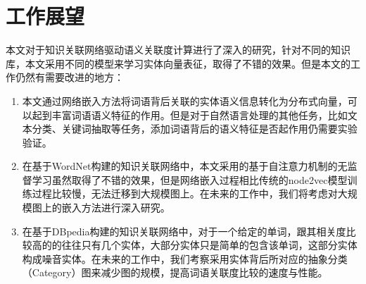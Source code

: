 \section{工作展望}
本文对于知识关联网络驱动语义关联度计算进行了深入的研究，针对不同的知识库，本文采用不同的模型来学习实体向量表征，取得了不错的效果。但是本文的工作仍然有需要改进的地方：
\begin{enumerate}[（1）]
    \item 本文通过网络嵌入方法将词语背后关联的实体语义信息转化为分布式向量，可以起到丰富词语语义特征的作用。但是对于自然语言处理的其他任务，比如文本分类、关键词抽取等任务，添加词语背后的语义特征是否起作用仍需要实验验证。
    \item 在基于WordNet构建的知识关联网络中，本文采用的基于自注意力机制的无监督学习虽然取得了不错的效果，但是网络嵌入过程相比传统的node2vec模型训练过程比较慢，无法迁移到大规模图上。在未来的工作中，我们将考虑对大规模图上的嵌入方法进行深入研究。
    \item 在基于DBpedia构建的知识关联网络中，对于一个给定的单词，跟其相关度比较高的的往往只有几个实体，大部分实体只是简单的包含该单词，这部分实体构成噪音实体。在未来的工作中，我们考察采用实体背后所对应的抽象分类（Category）图来减少图的规模，提高词语关联度比较的速度与性能。
\end{enumerate}